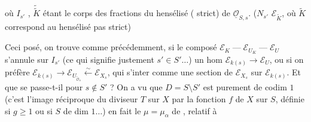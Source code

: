 où $I_{s'}$  , $\widetilde{\widetilde K}$ étant le corps des fractions du hensélisé ( strict) de $\underline{\mathcal O}_{S,s}$. ($N_{s'}$   $\mathcal E_{\widetilde K}$, où $\widetilde K$ correspond au hensélisé pas strict)

Ceci posé, on trouve comme précédemment, si le composé  $\mathcal E_K\mathrel{\text{---}}\mathcal E_{U_K}\mathrel{\text{---}}\mathcal E_U$ s'annule sur $I_{s'}$   (ce qui signifie justement  $s'\in S'\ldots$)  un hom $\mathcal E_{k(s)}\longrightarrow\mathcal E_U$, ou si on préfère $\mathcal E_{k(s)}\longrightarrow\mathcal E_{U_{\widetilde{\mathcal O}_s}}\xleftarrow{\sim}\mathcal E_{X_s}$, qui   s'inter comme une section de $\mathcal E_{X_s}$ sur $\mathcal E_{k(s)}$. Et que se passe-t-il pour $s\notin S'$ ?  On a vu que $D=S\setminus S'$ est purement de codim $1$ (c'est l'image réciproque du diviseur $T$ sur $X$ par la fonction $f$ de $X$ sur $S$, définie si $g\geq1$ ou si $S$ de dim $1\ldots$) en fait le $\mu=\mu_\alpha$ de , relatif à
